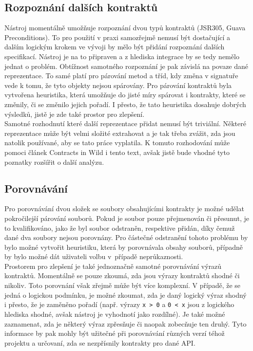 		\subsection{Rozpoznání dalších kontraktů}
			Nástroj momentálně umožňuje rozpoznání dvou typů kontraktů (JSR305, Guava Preconditions). To pro použití v praxi samozřejmě nemusí být dostačující a dalším logickým krokem ve vývoji by mělo být přidání rozpoznání dalších specifikací. Nástroj je na to připraven a z hlediska integrace by se tedy nemělo jednat o problém. Obtížnost samotného rozpoznání je pak závislá na povaze dané reprezentace. To samé platí pro párování metod a tříd, kdy změna v signatuře vede k tomu, že tyto objekty nejsou spárovány. Pro párování kontraktů byla vytvořena heuristika, která umožňuje do jisté míry spárovat i kontrakty, které se změnily, či se změnilo jejich pořadí. I přesto, že tato heuristika dosahuje dobrých výsledků, jistě je zde také prostor pro zlepšení.\\
			
			Samotné rozhodnutí které další reprezentace přidat nemusí být triviální. Některé reprezentace může být velmi složité extrahovat a je tak třeba zvážit, zda jsou natolik používané, aby se tato práce vyplatila. K tomuto rozhodování může pomoci článek Contracts in Wild \cite{contractsInWild} i tento text, avšak jistě bude vhodné tyto poznatky rozšířit o další analýzu.
			
		\subsection{Porovnávání}
			Pro porovnávání dvou složek se soubory obsahujícími kontrakty je možné udělat pokročilejší párování souborů. Pokud je soubor pouze přejmenován či přesunut, je to kvalifikováno, jako že byl soubor odstraněn, respektive přidán, díky čemuž dané dva soubory nejsou porovnány. Pro částečné odstranění tohoto problému by bylo možné vytvořit heuristiku, která by porovnávala obsahy souborů, případně by bylo možné dát uživateli volbu v~případě neprůkaznosti.\\
			
			Prostorem pro zlepšení je také jednoznačně samotné porovnávání výrazů kontraktů. Momentálně se pouze zkoumá, zda jsou výrazy kontraktů shodné či nikoliv. Toto porovnání však zřejmě může být více komplexní. V případě, že se jedná o logickou podmínku, je možné zkoumat, zda je daný logický výraz shodný i přesto, že je zaměněno pořadí (např. výrazy \texttt{x > 0} a \texttt{0 < x} jsou z logického hlediska shodné, avšak nástroj je vyhodnotí jako rozdílné). Je také možné zaznamenat, zda je některý výraz zpřesňuje či naopak zobecňuje ten druhý. Tyto informace by pak mohly být užitečné při porovnávání různých verzí téhož projektu a určovaní, zda se nezpřísnily kontrakty pro dané API.\\
			
